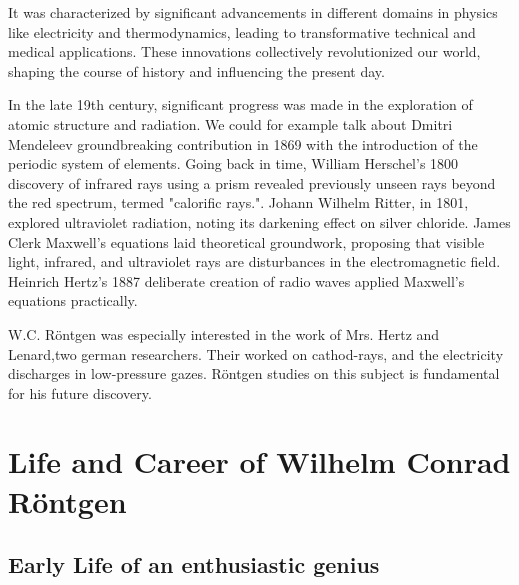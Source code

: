 \documentclass[a4paper,12pt]{report}
\begin{document}
It was characterized by significant advancements in different domains in physics like electricity
and thermodynamics, leading to transformative technical and medical applications. These
innovations collectively revolutionized our world, shaping the course of history and influencing
the present day.

In the late 19th century, significant progress was made in the exploration of atomic structure and
radiation. We could for example talk about Dmitri Mendeleev groundbreaking contribution in
1869 with the introduction of the periodic system of elements. Going back in time, William
Herschel's 1800 discovery of infrared rays using a prism revealed previously unseen rays beyond
the red spectrum, termed "calorific rays.". Johann Wilhelm Ritter, in 1801, explored ultraviolet
radiation, noting its darkening effect on silver chloride. James Clerk Maxwell's equations laid
theoretical groundwork, proposing that visible light, infrared, and ultraviolet rays are
disturbances in the electromagnetic field. Heinrich Hertz's 1887 deliberate creation of radio
waves applied Maxwell's equations practically. 

W.C. Röntgen was especially interested in the work of Mrs. Hertz and Lenard,two german researchers. Their worked on cathod-rays, and the electricity discharges in low-pressure gazes. Röntgen studies on this subject is fundamental for his future discovery. 
\chapter{Life and Career of Wilhelm Conrad Röntgen}
\section{Early Life of an enthusiastic genius}
\end{document}
